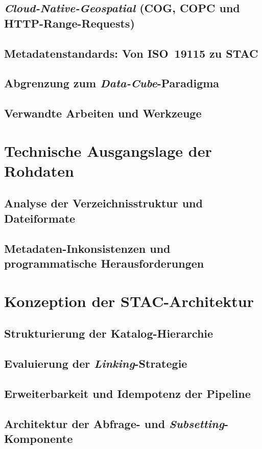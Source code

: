 \documentclass[12pt, a4paper, bibliography=totoc, listof=totoc]{scrreprt}
\begin{document}
\section{\textit{Cloud-Native-Geospatial} (COG, COPC und HTTP-Range-Requests)}
\section{Metadatenstandards: Von ISO~19115 zu STAC}
\section{Abgrenzung zum \textit{Data-Cube}-Paradigma}
\section{Verwandte Arbeiten und Werkzeuge}

\chapter{Technische Ausgangslage der Rohdaten}
\section{Analyse der Verzeichnisstruktur und Dateiformate}
\section{Metadaten-Inkonsistenzen und programmatische Herausforderungen}

\chapter{Konzeption der STAC-Architektur}
\section{Strukturierung der Katalog-Hierarchie}
\section{Evaluierung der \textit{Linking}-Strategie}
\section{Erweiterbarkeit und Idempotenz der Pipeline}
\section{Architektur der Abfrage- und \textit{Subsetting}-Komponente}
\end{document}
